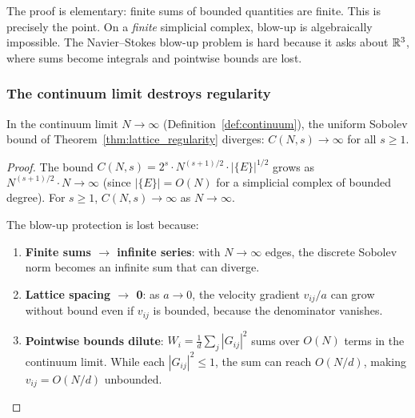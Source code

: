 \begin{remark}
The proof is elementary: finite sums of bounded quantities are finite.
This is precisely the point.  On a \emph{finite} simplicial complex,
blow-up is algebraically impossible.  The Navier--Stokes blow-up
problem is hard because it asks about $\mathbb{R}^3$, where sums become
integrals and pointwise bounds are lost.
\end{remark}

\subsubsection{The continuum limit destroys regularity}

\begin{theorem}
\label{thm:ns_nogo}
In the continuum limit $N \to \infty$ (Definition~\ref{def:continuum}),
the uniform Sobolev bound of Theorem~\ref{thm:lattice_regularity}
diverges: $C(N, s) \to \infty$ for all $s \geq 1$.
\end{theorem}

\begin{proof}
The bound $C(N, s) = 2^s \cdot N^{(s+1)/2} \cdot |\{E\}|^{1/2}$
grows as $N^{(s+1)/2} \cdot N \to \infty$ (since
$|\{E\}| = O(N)$ for a simplicial complex of bounded degree).
For $s \geq 1$, $C(N,s) \to \infty$ as $N \to \infty$.

The blow-up protection is lost because:
\begin{enumerate}
\item \textbf{Finite sums $\to$ infinite series}: with $N \to \infty$
  edges, the discrete Sobolev norm becomes an infinite sum that
  can diverge.
\item \textbf{Lattice spacing $\to$ 0}: as $a \to 0$, the velocity
  gradient $v_{ij}/a$ can grow without bound even if $v_{ij}$ is
  bounded, because the denominator vanishes.
\item \textbf{Pointwise bounds dilute}: $W_i = \frac{1}{d}\sum_j
  |G_{ij}|^2$ sums over $O(N)$ terms in the continuum limit.
  While each $|G_{ij}|^2 \leq 1$, the sum can reach $O(N/d)$,
  making $v_{ij} = O(N/d)$ unbounded.
\end{enumerate}
\end{proof}

